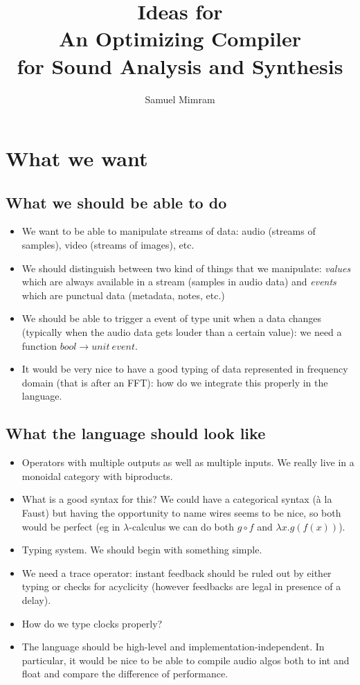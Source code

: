 \documentclass{article}
\title{Ideas for\\An Optimizing Compiler\\for Sound Analysis and Synthesis}
\author{Samuel Mimram}
\begin{document}
\maketitle

\section{What we want}
\subsection{What we should be able to do}
\begin{itemize}
\item We want to be able to manipulate streams of data: audio (streams of
  samples), video (streams of images), etc.
\item We should distinguish between two kind of things that we manipulate:
  \emph{values} which are always available in a stream (samples in audio data)
  and \emph{events} which are punctual data (metadata, notes, etc.)
\item We should be able to trigger a event of type unit when a data changes
  (typically when the audio data gets louder than a certain value): we need a
  function $bool \to unit\ event$.
\item It would be very nice to have a good typing of data represented in
  frequency domain (that is after an FFT): how do we integrate this properly in
  the language.
\end{itemize}

\subsection{What the language should look like}
\begin{itemize}
\item Operators with multiple outputs as well as multiple inputs. We really live
  in a monoidal category with biproducts.
\item What is a good syntax for this? We could have a categorical syntax (à la
  Faust) but having the opportunity to name wires seems to be nice, so both
  would be perfect (eg in $\lambda$-calculus we can do both $g\circ f$ and
  $\lambda x.g(f(x))$).
\item Typing system. We should begin with something simple.
\item We need a trace operator: instant feedback should be ruled out by either
  typing or checks for acyclicity (however feedbacks are legal in presence of a
  delay).
\item How do we type clocks properly?
\item The language should be high-level and implementation-independent. In
  particular, it would be nice to be able to compile audio algos both to int and
  float and compare the difference of performance.
\end{itemize}
\end{document}
